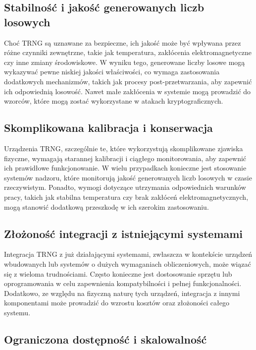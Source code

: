 \subsection{Stabilność i jakość generowanych liczb losowych}

Choć TRNG są uznawane za bezpieczne, ich jakość może być wpływana przez różne czynniki zewnętrzne, takie jak temperatura, zakłócenia elektromagnetyczne czy inne zmiany środowiskowe. W wyniku tego, generowane liczby losowe mogą wykazywać pewne niskiej jakości właściwości, co wymaga zastosowania dodatkowych mechanizmów, takich jak procesy post-przetwarzania, aby zapewnić ich odpowiednią losowość. Nawet małe zakłócenia w systemie mogą prowadzić do wzorców, które mogą zostać wykorzystane w atakach kryptograficznych.

\subsection{Skomplikowana kalibracja i konserwacja}

Urządzenia TRNG, szczególnie te, które wykorzystują skomplikowane zjawiska fizyczne, wymagają starannej kalibracji i ciągłego monitorowania, aby zapewnić ich prawidłowe funkcjonowanie. W wielu przypadkach konieczne jest stosowanie systemów nadzoru, które monitorują jakość generowanych liczb losowych w czasie rzeczywistym. Ponadto, wymogi dotyczące utrzymania odpowiednich warunków pracy, takich jak stabilna temperatura czy brak zakłóceń elektromagnetycznych, mogą stanowić dodatkową przeszkodę w ich szerokim zastosowaniu.

\subsection{Złożoność integracji z istniejącymi systemami}

Integracja TRNG z już działającymi systemami, zwłaszcza w kontekście urządzeń wbudowanych lub systemów o dużych wymaganiach obliczeniowych, może wiązać się z wieloma trudnościami. Często konieczne jest dostosowanie sprzętu lub oprogramowania w celu zapewnienia kompatybilności i pełnej funkcjonalności. Dodatkowo, ze względu na fizyczną naturę tych urządzeń, integracja z innymi komponentami może prowadzić do wzrostu kosztów oraz złożoności całego systemu.

\subsection{Ograniczona dostępność i skalowalność}

